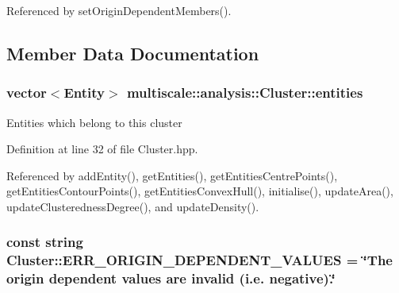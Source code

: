 Referenced by set\-Origin\-Dependent\-Members().



\subsection{Member Data Documentation}
\hypertarget{classmultiscale_1_1analysis_1_1Cluster_a820298479651328fb79d92a65f7923d6}{
\subsubsection[{entities}]{\setlength{\rightskip}{0pt plus 5cm}vector$<${\bf Entity}$>$ multiscale\-::analysis\-::\-Cluster\-::entities\hspace{0.3cm}{\ttfamily [private]}}}\label{classmultiscale_1_1analysis_1_1Cluster_a820298479651328fb79d92a65f7923d6}
Entities which belong to this cluster 

Definition at line 32 of file Cluster.\-hpp.



Referenced by add\-Entity(), get\-Entities(), get\-Entities\-Centre\-Points(), get\-Entities\-Contour\-Points(), get\-Entities\-Convex\-Hull(), initialise(), update\-Area(), update\-Clusteredness\-Degree(), and update\-Density().

\hypertarget{classmultiscale_1_1analysis_1_1Cluster_a0fa38fcc3f00730409400578829cddd8}{
\subsubsection[{E\-R\-R\-\_\-\-O\-R\-I\-G\-I\-N\-\_\-\-D\-E\-P\-E\-N\-D\-E\-N\-T\-\_\-\-V\-A\-L\-U\-E\-S}]{\setlength{\rightskip}{0pt plus 5cm}const string Cluster\-::\-E\-R\-R\-\_\-\-O\-R\-I\-G\-I\-N\-\_\-\-D\-E\-P\-E\-N\-D\-E\-N\-T\-\_\-\-V\-A\-L\-U\-E\-S = \char`\"{}The origin dependent values are invalid (i.\-e. negative).\char`\"{}\hspace{0.3cm}{\ttfamily [static]}}}\label{classmultiscale_1_1analysis_1_1Cluster_a0fa38fcc3f00730409400578829cddd8}


